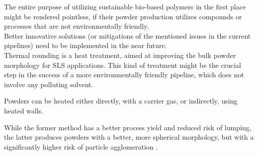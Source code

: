 \documentclass{article}
\begin{document}
    The entire purpose of utilizing sustainable bio-based polymers in the first place might be rendered pointless, if their powder production 
    utilizes compounds or processes that are not environmentally friendly. \\ 

    Better innovative solutions (or mitigations of the mentioned issues in the current pipelines) need to be implemented in the near future. \\ 

    Thermal rounding is a heat treatment, aimed at improving the bulk powder morphology for SLS applications. 
    This kind of treatment might be the crucial step in the success of a more environmentally friendly pipeline, which does not involve 
    any polluting solvent.

    Powders can be heated either directly, with a carrier gas, or indirectly, using heated walls. 

    While the former method has a better process yield and reduced risk of lumping, the latter produces powders with 
    a better, more spherical morphology, but with a significantly higher risk of particle agglomeration \autocite{Dechet_Schmidt_thermal_rounding}.

    \clearpage
\end{document}
